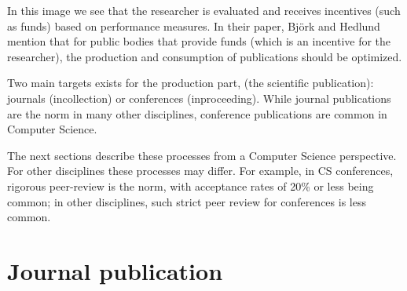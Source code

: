 \documentclass{ou-report}
\newcommand{\todo}[1]{{\color{red} TODO: #1}}
\newcommand{\outline}[1]{{\color{blue} #1}}
\begin{document}
In this image we see that the researcher is evaluated and receives incentives 
(such as funds) based on performance measures. In their paper,  Bj\"ork and 
Hedlund mention that for public bodies that provide funds (which is an incentive 
for the researcher), the production and consumption of publications should be 
optimized.
    


Two main targets exists for the production part, (the scientific publication): 
journals (incollection) or 
conferences (inproceeding). While journal publications are the norm in many 
other disciplines, conference publications are common in Computer Science.

The next sections describe these processes from a Computer Science perspective. 
For other disciplines these processes may differ. For example, in CS 
conferences, rigorous peer-review is the norm, with acceptance rates of 20\% or 
less being common; in other disciplines, such strict peer review for conferences is
less common.
    


\section{Journal publication}
\end{document}
